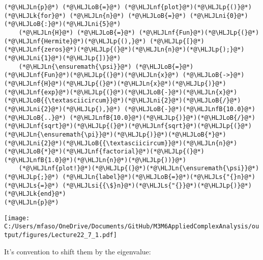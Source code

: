 \documentclass[12pt,landscape]{article}
\newcommand{\HLJLk}[1]{\textcolor[RGB]{148,91,176}{\textbf{#1}}}
\newcommand{\HLJLn}[1]{#1}
\newcommand{\HLJLnf}[1]{\textcolor[RGB]{66,102,213}{#1}}
\newcommand{\HLJLs}[1]{\textcolor[RGB]{201,61,57}{#1}}
\newcommand{\HLJLsi}[1]{#1}
\newcommand{\HLJLnfB}[1]{\textcolor[RGB]{59,151,46}{#1}}
\newcommand{\HLJLni}[1]{\textcolor[RGB]{59,151,46}{#1}}
\newcommand{\HLJLoB}[1]{\textcolor[RGB]{102,102,102}{\textbf{#1}}}
\newcommand{\HLJLp}[1]{#1}
\def\cent#1{\begin{center}#1\end{center} }
\begin{document}
{\begin{lstlisting}
(*@\HLJLn{p}@*) (*@\HLJLoB{=}@*) (*@\HLJLnf{plot}@*)(*@\HLJLp{()}@*)
(*@\HLJLk{for}@*) (*@\HLJLn{n}@*) (*@\HLJLoB{=}@*) (*@\HLJLni{0}@*)(*@\HLJLoB{:}@*)(*@\HLJLni{5}@*)
    (*@\HLJLn{H}@*) (*@\HLJLoB{=}@*) (*@\HLJLnf{Fun}@*)(*@\HLJLp{(}@*)(*@\HLJLnf{Hermite}@*)(*@\HLJLp{(),}@*) (*@\HLJLp{[}@*)(*@\HLJLnf{zeros}@*)(*@\HLJLp{(}@*)(*@\HLJLn{n}@*)(*@\HLJLp{);}@*)(*@\HLJLni{1}@*)(*@\HLJLp{])}@*)
    (*@\HLJLn{\ensuremath{\psi}}@*) (*@\HLJLoB{=}@*) (*@\HLJLnf{Fun}@*)(*@\HLJLp{(}@*)(*@\HLJLn{x}@*) (*@\HLJLoB{->}@*) (*@\HLJLnf{H}@*)(*@\HLJLp{(}@*)(*@\HLJLn{x}@*)(*@\HLJLp{)}@*)(*@\HLJLnf{exp}@*)(*@\HLJLp{(}@*)(*@\HLJLoB{-}@*)(*@\HLJLn{x}@*)(*@\HLJLoB{{\textasciicircum}}@*)(*@\HLJLni{2}@*)(*@\HLJLoB{/}@*)(*@\HLJLni{2}@*)(*@\HLJLp{),}@*) (*@\HLJLoB{-}@*)(*@\HLJLnfB{10.0}@*) (*@\HLJLoB{..}@*) (*@\HLJLnfB{10.0}@*)(*@\HLJLp{)}@*)(*@\HLJLoB{/}@*)(*@\HLJLnf{sqrt}@*)(*@\HLJLp{(}@*)(*@\HLJLnf{sqrt}@*)(*@\HLJLp{(}@*)(*@\HLJLn{\ensuremath{\pi}}@*)(*@\HLJLp{)}@*)(*@\HLJLoB{*}@*)(*@\HLJLni{2}@*)(*@\HLJLoB{{\textasciicircum}}@*)(*@\HLJLn{n}@*)(*@\HLJLoB{*}@*)(*@\HLJLnf{factorial}@*)(*@\HLJLp{(}@*)(*@\HLJLnfB{1.0}@*)(*@\HLJLn{n}@*)(*@\HLJLp{))}@*)
    (*@\HLJLnf{plot!}@*)(*@\HLJLp{(}@*)(*@\HLJLn{\ensuremath{\psi}}@*)(*@\HLJLp{;}@*) (*@\HLJLn{label}@*)(*@\HLJLoB{=}@*)(*@\HLJLs{"{}n}@*) (*@\HLJLs{=}@*) (*@\HLJLsi{{\$}n}@*)(*@\HLJLs{"{}}@*)(*@\HLJLp{)}@*)
(*@\HLJLk{end}@*)
(*@\HLJLn{p}@*)
\end{lstlisting}

\cent{\texttt{[image: C:/Users/mfaso/OneDrive/Documents/GitHub/M3M6AppliedComplexAnalysis/output/figures/Lecture22\_7\_1.pdf]}}

It's convention to shift them by the eigenvalue:


}
\end{document}
